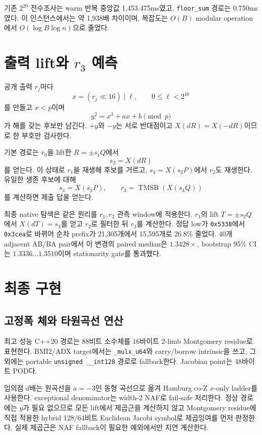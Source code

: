 \documentclass[10pt,a4paper]{article}
\begin{document}
기존 \(2^{20}\) 전수조사는 warm 반복 중앙값 1,453.475ms였고,
\texttt{floor\_sum} 경로는 0.750ms였다. 이 인스턴스에서는 약 1,938배
차이이며, 복잡도는 \(O(B)\) modular operation에서
\(O(\log B\log n)\)으로 줄었다.

\section{출력 lift와 \texorpdfstring{\(r_3\)}{r3} 예측}

공개 출력 \(r_j\)마다
\[
 x=(r_j\ll16)\mathbin{|}\ell,\qquad 0\le\ell<2^{16}
\]
를 만들고 \(x<p\)이며
\[
 y^2=x^3+ax+b\pmod p
\]
가 해를 갖는 후보만 남긴다. \(+y\)와 \(-y\)는 서로 반대점이고
\(X(dR)=X(-dR)\)이므로 한 부호만 검사한다.

기본 경로는 \(r_0\)을 lift한 \(R=\pm s_1Q\)에서
\[
 s_2=X(dR)
\]
를 얻는다. 이 상태로 \(r_1\)을 재생해 후보를 거르고,
\(s_3=X(s_2P)\)에서 \(r_2\)도 재생한다. 유일한 생존 후보에 대해
\[
 s_4=X(s_3P),\qquad
 r_3=\operatorname{TMSB}(X(s_4Q))
\]
를 계산하면 제출 답을 얻는다.

최종 native 탐색은 같은 원리를 \(r_1,r_2\) 관측 window에 적용한다.
\(r_1\)의 lift \(T=\pm s_2Q\)에서 \(X(dT)=s_3\)를 얻고 \(r_2\)로
필터한 뒤 \(r_3\)를 계산한다. 정답 low가 \texttt{0x5338}에서
\texttt{0x3cea}로 바뀌어 순차 prefix가 21,305개에서 15,595개로
26.8\% 줄었다. 40개 adjacent AB/BA pair에서 이 변경의 paired
median은 \(1.3428\times\), bootstrap 95\% CI는
\(1.3336\ldots1.3510\)이며 stationarity gate를 통과했다.

\section{최종 구현}

\subsection{고정폭 체와 타원곡선 연산}

최고 성능 C++20 경로는 88비트 소수체를 16바이트 2-limb Montgomery
residue로 표현한다. BMI2/ADX target에서는 \texttt{\_mulx\_u64}와
carry/borrow intrinsic을 쓰고, 그 외에는 portable
\texttt{unsigned \_\_int128} 경로로 fallback한다. Jacobian point는
48바이트 POD다.

임의점 \(d\)배는 원곡선을 \(a=-3\)인 동형 곡선으로 옮겨 Hamburg
co-Z \(x\)-only ladder를 사용한다. exceptional denominator는
width-2 NAF로 fail-safe 처리한다. 정상 경로에는 \(y\)가 필요 없으므로
모든 lift에서 제곱근을 계산하지 않고 Montgomery residue에 직접 적용한
hybrid 128/64비트 Euclidean Jacobi symbol로 제곱잉여를 먼저 판정한다.
실제 제곱근은 NAF fallback이 필요한 예외에서만 지연 계산한다.
\end{document}
